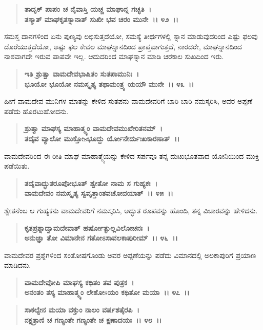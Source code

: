 \begin{verse}
\textbf{ತಾದೃಕ್ ಪಾಪಂ ಚ ನೈವಾಸ್ತಿ ಯಚ್ಚ ಮಾಘಾನ್ನ ಗಚ್ಛತಿ~।}\\\textbf{ತಸ್ಮಾತ್ ಮಾಘಕೃತಸ್ನಾನಾತ್ ಸುಖೀ ಭವ ಚಿರಂ ಮುನೇ~।। ೪೨~।।}
\end{verse}

ಸಮಸ್ತ ದಾನಗಳಿಂದ ಏನು ಪುಣ್ಯವು ಲಭಿಸುತ್ತದೆಯೋ, ಸಮಸ್ಯೆ ತೀರ್ಥಗಳಲ್ಲಿ ಸ್ನಾನ ಮಾಡುವುದರಿಂದ ಎಷ್ಟು ಫಲವು ದೊರೆಯುತ್ತದೆಯೋ, ಅಷ್ಟು ಫಲ ಕೇವಲ ಮಾಘಸ್ನಾನದಿಂದ ಪ್ರಾಪ್ತವಾಗುತ್ತದೆ, ನಾರದರೇ, ಮಾಘಸ್ನಾನದಿಂದ ನಾಶವಾಗದೇ ಇರುವ ಪಾಪವೇ ಇಲ್ಲ. ಆದುದರಿಂದ ಮಾಘಸ್ನಾನ ಮಾಡಿ ಚಿರಕಾಲ ಸುಖದಿಂದ ಇರು.

\begin{verse}
\textbf{ಇತಿ ಶ್ರುತ್ವಾ ವಾಮದೇವಭಾಷಿತಂ ಸುತಪಾಮುನಿಃ~।}\\\textbf{ಭೂಯೋ ಭೂಯೋ ನಮಸ್ಕೃತ್ಯ ತಥಾಮಂತ್ರ್ಯ ಯಯೌ ಮುನೇ~।। ೪೩~।।}
\end{verse}

ಹೀಗೆ ವಾಮದೇವ ಮುನಿಗಳ ಮಾತನ್ನು ಕೇಳಿದ ಸುತಪನು ವಾಮದೇವರಿಗೆ ಬಾರಿ ಬಾರಿ ನಮಸ್ಕರಿಸಿ, ಅವರ ಅಪ್ಪಣೆ ಪಡೆದು ಹೊರಟುಹೋದನು.

\begin{verse}
\textbf{ಶ್ರುತ್ವಾ ಮಾಘಸ್ಯ ಮಾಹಾತ್ಮ್ಯಂ ವಾಮದೇವಮುಖೇರಿತನಮ್~।}\\\textbf{ತದೈವ ವ್ಯಾಲೋ ಮುಕ್ತೋsಭೂದ್ದು ರ್ಯೋನೇರ್ದುಃಖಕಾರಣಾತ್~।।}
\end{verse}

ವಾಮದೇವರಿಂದ ಈ ರೀತಿ ಮಾಘ ಮಾಹಾತ್ಮ್ಯೆಯನ್ನು ಕೇಳಿದ ಸರ್ಪವೂ ತನ್ನ ದುಃಖಭೂತವಾದ ಯೋನಿಯಿಂದ ಮುಕ್ತಿ ಪಡೆಯಿತು.

\begin{verse}
\textbf{ತದೈವಾದ್ಭುತರೂಪೋಭೂತ್ ಶ್ವೇತೋ ನಾಮ ಸ ಗುಹ್ಯಕಃ~।}\\\textbf{ವಾಮದೇವಂ ನಮಸ್ಕೃತ್ಯ ಸ್ವವೃತ್ತಾಂತವಚೋದಯಾತ್~।। ೪೫~।।}
\end{verse}

ಶ್ವೇತನೆಂಬ ಆ ಗುಹ್ಯಕನು ವಾಮದೇವರಿಗೆ ನಮಸ್ಕರಿಸಿ, ಅದ್ಭುತ ರೂಪವನ್ನು ಹೊಂದಿ, ತನ್ನ ವಿಚಾರವನ್ನು ಹೇಳಿದನು.

\begin{verse}
\textbf{ಕೃತಪ್ರಶ್ನಾದ್ವಾಮದೇವಾತ್ ಹರ್ಷೋತ್ಫುಲ್ಲವಿಲೋಚನಃ~।}\\\textbf{ಅನುಜ್ಞಾ ತೋ ವಿಮಾನೇನ ಗತೋಽಸಾವಲಕಾಪುರೀಮ್~।। ೪೬~।।}
\end{verse}

ವಾಮದೇವರ ಪ್ರಶ್ನೆಗಳಿಂದ ಸಂತೋಷಗೊಂಡು ಅವರ ಅಪ್ಪಣೆಯನ್ನು ಪಡೆದು ವಿಮಾನದಲ್ಲಿ ಅಲಕಾಪುರಿಗೆ ಪ್ರಯಾಣ ಮಾಡಿದನು.

\begin{verse}
\textbf{ವಾಮದೇವೋಪಿ ಮಾಘಸ್ಯ ಕಥಿತಂ ತವ ಪುತ್ರಕ~।}\\\textbf{ಅನಂತಂ ತಸ್ಯ ಮಾಹಾತ್ಮ್ಯಂ ಲೇಶೋsಯಂ ಕಥಿತೋ ಮಯಾ~।। ೪೭~।। }
\end{verse}

\begin{verse}
\textbf{ಸಾಕಲ್ಯೇನ ಮಯಾ ವಕ್ತುಂ ನಾಲಂ ವರ್ಷಶತೈರಪಿ~।}\\\textbf{ನಕ್ಷತ್ರಾಣಿ ಚ ಗಣ್ಯಂತೇ ಗಣ್ಯಂತೇ ಚ ಕ್ಷಣಾದಯಃ~।। ೪೮~।।} 
\end{verse}

